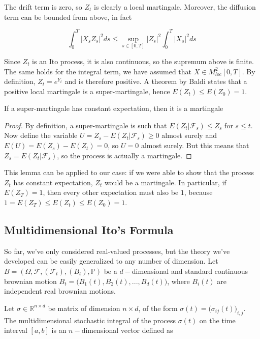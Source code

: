 The drift term is zero, so $Z_t$ is clearly a local martingale. Moreover, the diffusion term can be bounded from above, in fact

\begin{equation*}
    \int_0^T \vert X_s Z_s \vert^2 ds \leq \sup_{s \in [0,T]} \vert Z_s \vert^2 \int_0^T \vert X_s \vert^2 ds 
\end{equation*}

Since $Z_t$ is an Ito process, it is also continuous, so the supremum above is finite. The same holds for the integral term, we have assumed that $X \in M^2_{loc}[0,T]$. By definition, $Z_t = e^{Y_t}$ and is therefore positive. A theorem by Baldi states that a positive local martingale is a super-martingale, hence $E(Z_t) \leq E(Z_0) = 1$. 

\begin{lemma}
    If a super-martingale has constant expectation, then it is a martingale
\end{lemma}
\begin{proof}
    By definition, a super-martingale is such that $E(Z_t \vert \mathcal{F}_s) \leq Z_s$ for $s \leq t$. Now define the variable $U = Z_s - E(Z_t \vert \mathcal{F}_s) \geq 0$ almost surely and $E(U) = E(Z_s) - E(Z_t) = 0$, so $U = 0$ almost surely. But this means that $Z_s = E(Z_t \vert \mathcal{F}_s)$, so the process is actually a martingale.  
\end{proof}

This lemma can be applied to our case: if we were able to show that the process $Z_t$ has constant expectation, $Z_t$ would be a martingale. In particular, if $E(Z_T) = 1$, then every other expectation must also be $1$, because $1 = E(Z_T) \leq E(Z_t) \leq E(Z_0) = 1$. 

\subsection{Multidimensional Ito's Formula}
So far, we've only considered real-valued processes, but the theory we've developed can be easily generalized to any number of dimension. Let $B = (\Omega, \mathcal{F}, (\mathcal{F}_t), (B_t), \mathbb{P})$ be a $d-$dimensional and standard continuous brownian motion $B_t = \big(B_1(t), B_2(t),...,B_d(t)\big)$, where $B_i(t)$ are independent real brownian motions. 

Let $\sigma \in \mathbb{R}^{n \times d}$ be matrix of dimension $n \times d$, of the form $\sigma(t) = \big( \sigma_{ij}(t) \big)_{i,j}$. The multidimensional stochastic integral of the process $\sigma(t)$ on the time interval $[a,b]$ is an $n-$dimensional vector defined as

